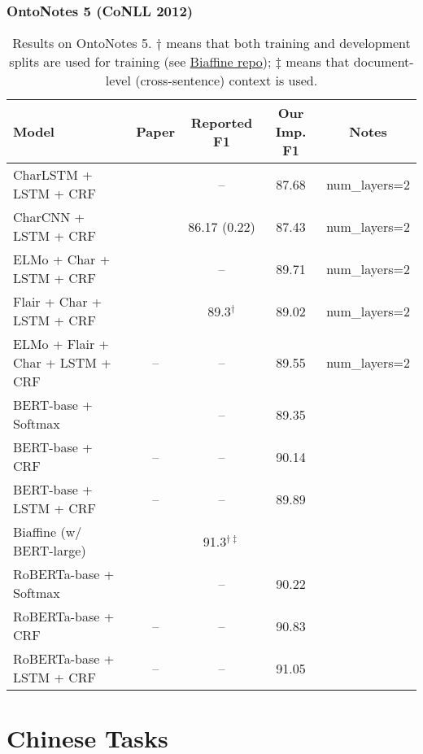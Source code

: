 \documentclass{article}
\begin{document}
\subsubsection{OntoNotes 5 (CoNLL 2012)}
\begin{table}[H]
    \centering
    \begin{tabular}{lcccc}
    \toprule
    Model & Paper & Reported F1 & Our Imp. F1 & Notes \\
    \midrule
    CharLSTM + LSTM + CRF       & \citet{lample2016neural}    & --            & 87.68 & num\_layers=2 \\
    CharCNN + LSTM + CRF        & \citet{chiu2016named}       & 86.17 (0.22)  & 87.43 & num\_layers=2 \\
    ELMo + Char + LSTM + CRF    & \citet{peters2018deep}      & --            & 89.71 & num\_layers=2 \\
    Flair + Char + LSTM + CRF   & \citet{akbik2018contextual} & 89.3$^{\dagger}$ & 89.02 & num\_layers=2 \\
    ELMo + Flair + Char + LSTM + CRF & --                     & --            & 89.55 & num\_layers=2 \\
    \midrule
    BERT-base + Softmax         & \citet{devlin2019bert} & --            & 89.35 \\
    BERT-base + CRF             & --                     & --            & 90.14 \\
    BERT-base + LSTM + CRF      & --                     & --            & 89.89 \\
    Biaffine (w/ BERT-large)    & \citet{yu2020named}    & 91.3$^{\dagger\ddagger}$ \\
    RoBERTa-base + Softmax      & \citet{liu2019roberta} & --            & 90.22 \\
    RoBERTa-base + CRF          & --                     & --            & 90.83 \\
    RoBERTa-base + LSTM + CRF   & --                     & --            & 91.05 \\
    \bottomrule
    \end{tabular}
    \caption{Results on OntoNotes 5. $\dagger$ means that both training and development splits are used for training (see \href{https://github.com/juntaoy/biaffine-ner/issues/16}{Biaffine repo}); $\ddagger$ means that document-level (cross-sentence) context is used.} 
\end{table}


\newpage
\section{Chinese Tasks}
\end{document}
